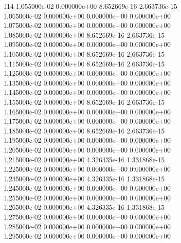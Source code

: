 114	1.055000e-02	0.000000e+00	8.652669e-16	2.663736e-15	\\ 	1.065000e-02	0.000000e+00	0.000000e+00	0.000000e+00	\\ 	1.075000e-02	0.000000e+00	0.000000e+00	0.000000e+00	\\ 	1.085000e-02	0.000000e+00	8.652669e-16	2.663736e-15	\\ 	1.095000e-02	0.000000e+00	0.000000e+00	0.000000e+00	\\ 	1.105000e-02	0.000000e+00	8.652669e-16	2.663736e-15	\\ 	1.115000e-02	0.000000e+00	8.652669e-16	2.663736e-15	\\ 	1.125000e-02	0.000000e+00	0.000000e+00	0.000000e+00	\\ 	1.135000e-02	0.000000e+00	0.000000e+00	0.000000e+00	\\ 	1.145000e-02	0.000000e+00	0.000000e+00	0.000000e+00	\\ 	1.155000e-02	0.000000e+00	8.652669e-16	2.663736e-15	\\ 	1.165000e-02	0.000000e+00	0.000000e+00	0.000000e+00	\\ 	1.175000e-02	0.000000e+00	0.000000e+00	0.000000e+00	\\ 	1.185000e-02	0.000000e+00	8.652669e-16	2.663736e-15	\\ 	1.195000e-02	0.000000e+00	0.000000e+00	0.000000e+00	\\ 	1.205000e-02	0.000000e+00	0.000000e+00	0.000000e+00	\\ 	1.215000e-02	0.000000e+00	4.326335e-16	1.331868e-15	\\ 	1.225000e-02	0.000000e+00	0.000000e+00	0.000000e+00	\\ 	1.235000e-02	0.000000e+00	4.326335e-16	1.331868e-15	\\ 	1.245000e-02	0.000000e+00	0.000000e+00	0.000000e+00	\\ 	1.255000e-02	0.000000e+00	0.000000e+00	0.000000e+00	\\ 	1.265000e-02	0.000000e+00	4.326335e-16	1.331868e-15	\\ 	1.275000e-02	0.000000e+00	0.000000e+00	0.000000e+00	\\ 	1.285000e-02	0.000000e+00	0.000000e+00	0.000000e+00	\\ 	1.295000e-02	0.000000e+00	0.000000e+00	0.000000e+00	\\ \hline

